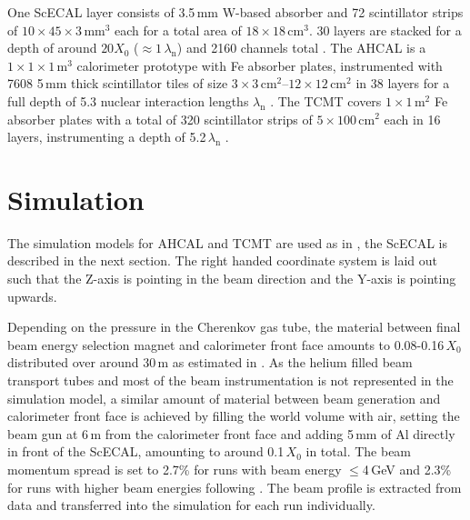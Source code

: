 \documentclass[twoside,a4paper,12pt]{article}
\begin{document}
One ScECAL layer consists of 3.5\,mm W-based absorber and 72 scintillator strips of $10\times45\times3\,\text{mm}^3$ each for a total area of $18\times18\,\text{cm}^3$. 30 layers are stacked for a depth of around $20X_0$ ($\approx 1\,\lambda_\text{n}$) and 2160 channels total \cite{CAN16}.
The AHCAL is a $1\times1\times1\,\text{m}^3$ calorimeter prototype with Fe absorber plates, instrumented with 7608 5\,mm thick scintillator tiles of size $3\times3\,\text{cm}^2$--$12\times12\,\text{cm}^2$ in 38 layers for a full depth of 5.3 nuclear interaction lengths $\lambda_\text{n}$ \cite{CommPaper}. The TCMT covers $1\times1\,\text{m}^2$ Fe absorber plates with a total of 320 scintillator strips of $5\times100\,\text{cm}^2$ each in 16 layers, instrumenting a depth of 5.2\,$\lambda_\text{n}$ \cite{TCMTPaper}.

 



\section{Simulation}
The simulation models for AHCAL and TCMT are used as in \cite{Feege, Guenter}, the ScECAL is described in the next section. 
The right handed coordinate system is laid out such that the Z-axis is pointing in the beam direction and the Y-axis is pointing upwards. 

Depending on the pressure in the Cherenkov gas tube, the material between final beam energy selection magnet and calorimeter front face amounts to 0.08-0.16\,$X_0$ distributed over around 30\,m as estimated in \cite{Feege}.
As the helium filled beam transport tubes and most of the beam instrumentation is not represented in the simulation model, a similar amount of material between beam generation and calorimeter front face is achieved by filling the world volume with air, setting the beam gun at 6\,m from the calorimeter front face and adding 5\,mm of Al directly in front of the ScECAL, amounting to around 0.1\,$X_0$ in total. The beam momentum spread is set to 2.7\% for runs with beam energy $\leq$4\,GeV and 2.3\% for runs with higher beam energies following \cite{CAN16b}. The beam profile is extracted from data and transferred into the simulation for each run individually. 
\end{document}
